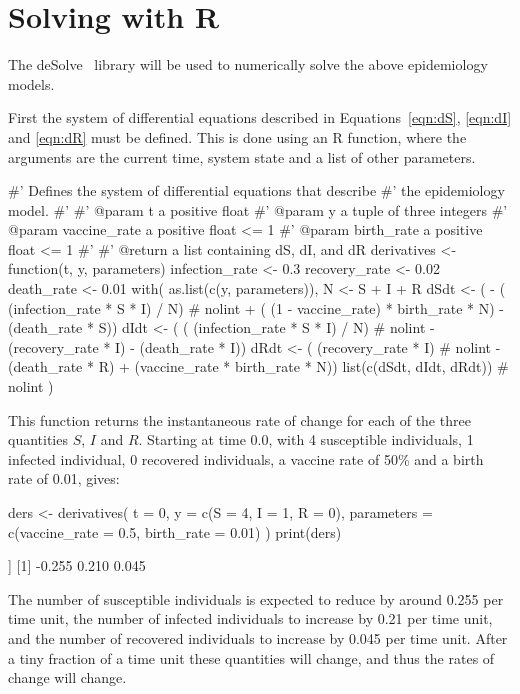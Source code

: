 \section{Solving with R}\label{sec:system_dynamics_solving-with-R}

The deSolve~\cite{soetaert2010solving} library will be used to numerically
solve the above epidemiology models.

First the system of differential equations described in Equations~\ref{eqn:dS},
\ref{eqn:dI} and \ref{eqn:dR} must be defined. This is done using an R function,
where the arguments are the current time, system state and a list of other
parameters.

\begin{Rin}
#' Defines the system of differential equations that describe
#' the epidemiology model.
#'
#' @param t a positive float
#' @param y a tuple of three integers
#' @param vaccine_rate a positive float <= 1
#' @param birth_rate a positive float <= 1
#'
#' @return a list containing dS, dI, and dR
derivatives <- function(t, y, parameters){
  infection_rate <- 0.3
  recovery_rate <- 0.02
  death_rate <- 0.01
  with(
    as.list(c(y, parameters)), {
      N <- S + I + R
      dSdt <- ( - ( (infection_rate * S * I) / N)  # nolint
        + ( (1 - vaccine_rate) * birth_rate * N)
        - (death_rate * S))
      dIdt <- ( ( (infection_rate * S * I) / N)  # nolint
        - (recovery_rate * I)
        - (death_rate * I))
      dRdt <- ( (recovery_rate * I)  # nolint
        - (death_rate * R)
        + (vaccine_rate * birth_rate * N))
      list(c(dSdt, dIdt, dRdt))  # nolint
    }
  )
}
\end{Rin}

This function returns the instantaneous rate of change for each of the
three quantities $S$, $I$ and $R$. Starting at time 0.0, with 4 susceptible
individuals, 1 infected individual, 0 recovered individuals, a vaccine rate
of 50\% and a birth rate of 0.01, gives:

\begin{Rin}
ders <- derivatives(
  t = 0,
  y = c(S = 4, I = 1, R = 0),
  parameters = c(vaccine_rate = 0.5, birth_rate = 0.01)
)
print(ders)
\end{Rin}

\begin{Rout}
[[1]]
[1] -0.255  0.210  0.045

\end{Rout}

The number of susceptible individuals is expected to reduce by around 0.255 per
time unit, the number of infected individuals to increase by 0.21 per time unit,
and the number of recovered individuals to increase by 0.045 per time unit.
After a tiny fraction of a time unit these quantities will change, and thus the
rates of change will change.

